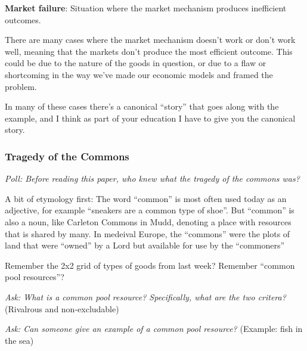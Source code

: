 \documentclass[11pt]{article}
\begin{document}
{\bf Market failure}: Situation where the market mechanism produces inefficient outcomes.

There are many cases where the market mechanism doesn't work or don't work well, meaning that the markets don't  produce the most efficient outcome. This could be due to the nature of the goods in question, or due to a flaw or shortcoming in the way we've made our economic models and framed the problem.

In many of these cases there's a canonical ``story'' that goes along with the example, and I think as part of your education I have to give you the canonical story.

\subsubsection{Tragedy of the Commons}

{\it Poll: Before reading this paper, who knew what the tragedy of the commons was?}

A bit of etymology first: The word ``common'' is most often used today as an adjective, for example ``sneakers are a common type of shoe''.
But ``common'' is also a noun, like Carleton Commons in Mudd, denoting a place with resources that is shared by many. In medeival Europe, the ``commons'' were the plots of land that were ``owned'' by a Lord but available for use by the ``commoners''

Remember the 2x2 grid of types of goods from last week? Remember ``common pool resources''?

{\it Ask: What is a common pool resource? Specifically, what are the two critera?} (Rivalrous and non-excludable)

{\it Ask: Can someone give an example of a common pool resource?} (Example: fish in the sea)
\end{document}
